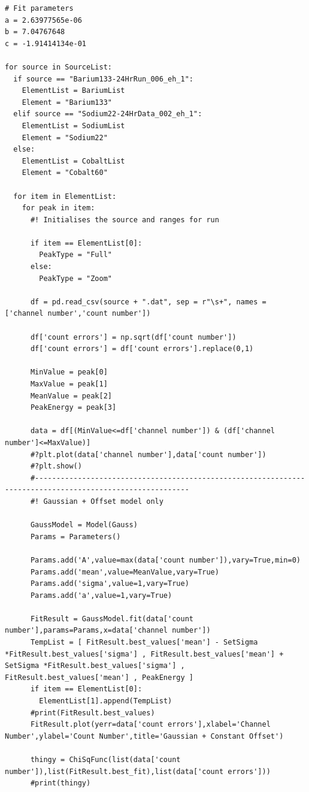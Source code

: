\documentclass[11pt,a4paper]{article}
\begin{document}
\begin{verbatim}
# Fit parameters
a = 2.63977565e-06
b = 7.04767648
c = -1.91414134e-01

for source in SourceList:
  if source == "Barium133-24HrRun_006_eh_1":
    ElementList = BariumList
    Element = "Barium133"
  elif source == "Sodium22-24HrData_002_eh_1":
    ElementList = SodiumList
    Element = "Sodium22"
  else:
    ElementList = CobaltList
    Element = "Cobalt60"

  for item in ElementList:
    for peak in item:
      #! Initialises the source and ranges for run

      if item == ElementList[0]:
        PeakType = "Full"
      else:
        PeakType = "Zoom"

      df = pd.read_csv(source + ".dat", sep = r"\s+", names = ['channel number','count number'])

      df['count errors'] = np.sqrt(df['count number'])
      df['count errors'] = df['count errors'].replace(0,1)

      MinValue = peak[0]
      MaxValue = peak[1]
      MeanValue = peak[2]
      PeakEnergy = peak[3]

      data = df[(MinValue<=df['channel number']) & (df['channel number']<=MaxValue)]
      #?plt.plot(data['channel number'],data['count number'])
      #?plt.show()
      #----------------------------------------------------------------------------------------------------------
      #! Gaussian + Offset model only

      GaussModel = Model(Gauss)
      Params = Parameters()

      Params.add('A',value=max(data['count number']),vary=True,min=0)
      Params.add('mean',value=MeanValue,vary=True)
      Params.add('sigma',value=1,vary=True)
      Params.add('a',value=1,vary=True)

      FitResult = GaussModel.fit(data['count number'],params=Params,x=data['channel number'])
      TempList = [ FitResult.best_values['mean'] - SetSigma *FitResult.best_values['sigma'] , FitResult.best_values['mean'] + SetSigma *FitResult.best_values['sigma'] , FitResult.best_values['mean'] , PeakEnergy ] 
      if item == ElementList[0]:
        ElementList[1].append(TempList)
      #print(FitResult.best_values)
      FitResult.plot(yerr=data['count errors'],xlabel='Channel Number',ylabel='Count Number',title='Gaussian + Constant Offset')

      thingy = ChiSqFunc(list(data['count number']),list(FitResult.best_fit),list(data['count errors']))
      #print(thingy)


\end{verbatim}
\end{document}
